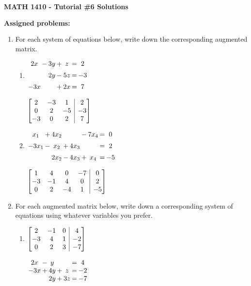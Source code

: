 \documentclass[12pt]{article}
\makeatletter
\newenvironment{amatrix}[1]{%
  \left[\begin{array}{@{}*{#1}{c}|c@{}}
}{%
  \end{array}\right]
}
\newcommand{\bam}{\begin{amatrix}}
\newcommand{\eam}{\end{amatrix}}
\makeatother
\begin{document}
\author{Instructor: Sean Fitzpatrick}
\thispagestyle{empty}
\begin{center}
{\bf MATH 1410 - Tutorial \#6 Solutions}
\end{center}

\textbf{Assigned problems:}

 \begin{enumerate}
\item For each system of equations below, write down the corresponding augmented matrix.
\begin{multicols}{2}
\begin{enumerate}
 \item $\arraycolsep=1pt\begin{array}{ccccccc}2x&-&3y&+&z&=&2\\[5pt] & &2y&-&5z&=&-3\\[5pt] -3x& & &+&2x&=&7\end{array}$

\medskip

 $\bam{3}2&-3&1&2\\0&2&-5&-3\\-3&0&2&7\eam$

 \item $\arraycolsep=1pt\begin{array}{ccccccccc}x_1&+&4x_2& & &-&7x_4&=&0\\[5pt]-3x_1&-&x_2&+&4x_3& & &=&2\\[5pt] & &2x_2&-&4x_3&+&x_4&=&-5\end{array}$
 
 \medskip
 
 $\bam{4}1&4&0&-7&0\\-3&-1&4&0&2\\0&2&-4&1&-5\eam$
 \end{enumerate}
\end{multicols}

\bigskip

\item For each augmented matrix below, write down a corresponding system of equations using whatever variables you prefer.
\begin{multicols}{2}
\begin{enumerate}
 \item $\bam{3}2&-1&0&4\\-3&4&1&-2\\0&2&3&-7\eam$

\medskip

 $\arraycolsep=1pt\begin{array}{ccccccc}
 2x&-&y& & &=&4\\-3x&+&4y&+&z&=&-2\\ & &2y&+&3z&=&-7\end{array}$


\end{enumerate}
\end{multicols}
\end{enumerate}
\end{document}

